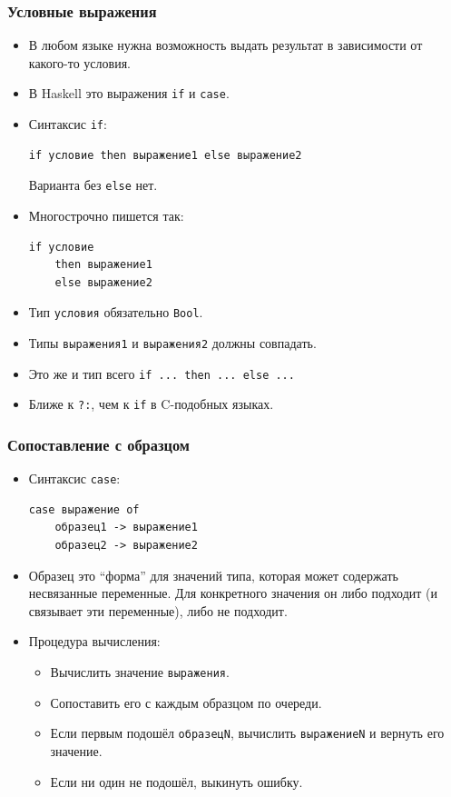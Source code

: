 \documentclass[10pt]{beamer}
\begin{document}
\begin{frame}[fragile]
\frametitle{Условные выражения}
\begin{itemize}
    \item В любом языке нужна возможность выдать результат в зависимости от какого-то условия.
    \item В Haskell это выражения \lstinline|if| и \lstinline|case|.
    \item Синтаксис \lstinline|if|: 
\begin{lstlisting}
if условие then выражение1 else выражение2
\end{lstlisting}    
    Варианта без \lstinline|else| нет.
    \item Многострочно пишется так:
\begin{lstlisting}
if условие 
    then выражение1 
    else выражение2
\end{lstlisting}    
    \item Тип \lstinline|условия| обязательно \lstinline|Bool|.
    \item Типы \lstinline|выражения1| и \lstinline|выражения2| должны совпадать. 
    \item Это же и тип всего  \lstinline|if ... then ... else ...|
\item Ближе к \lstinline|?:|, чем к \lstinline|if| в C-подобных языках.
\end{itemize}
\end{frame}

\begin{frame}[fragile]
\frametitle{Сопоставление с образцом}
\begin{itemize}
    \item Синтаксис \lstinline|case|: \\
\begin{lstlisting}
case выражение of 
    образец1 -> выражение1 
    образец2 -> выражение2
\end{lstlisting}
    \item Образец это \enquote{форма} для значений типа, которая может содержать несвязанные переменные. Для конкретного значения он либо подходит (и связывает эти переменные), либо не подходит.
    \item Процедура вычисления:
    \begin{itemize}
        \item Вычислить значение \lstinline|выражения|.
        \item Сопоставить его с каждым образцом по очереди. 
        \item Если первым подошёл \lstinline|образецN|, вычислить \lstinline|выражениеN| и вернуть его значение.
        \item Если ни один не подошёл, выкинуть ошибку.
    \end{itemize}
\end{itemize}
\end{frame}
\end{document}
